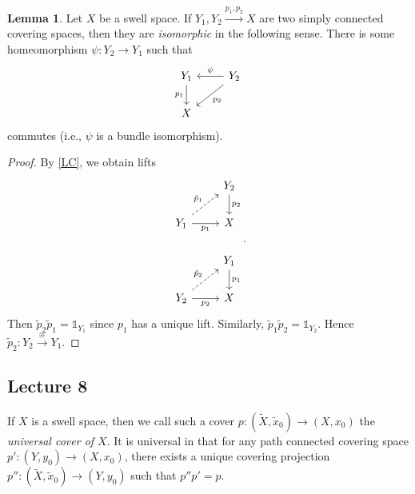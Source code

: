 \documentclass[10pt,letterpaper,cm]{nupset}
\theoremstyle{definition}
\theoremstyle{theorem}
\newtheorem{lemma}[definition]{Lemma}
\theoremstyle{remark}
\newcommand{\1}{\mathbb{1}}
\newcommand{\0}{\vec 0}
\begin{document}
\begin{lemma}
Let $X$ be a swell space.  If $Y_1, Y_2 \overset{p_1, p_2}{\longrightarrow} X$ are two simply connected covering spaces, then they are \textit{isomorphic} in the following sense. There is some homeomorphism $\psi : Y_2 \to Y_1$ such that 
\[
\begin{tikzcd}
Y_1 \arrow[d, "p_1"'] & Y_2 \arrow[ld, "p_2"] \arrow[l, "\psi"'] \\
X & 
\end{tikzcd}
\] commutes (i.e., $\psi$ is a bundle isomorphism).
\end{lemma}
\begin{proof}
By \cref{LC}, we obtain lifts
\[
\begin{tikzcd}
 & Y_2 \arrow[d, "p_2"] \\
Y_1 \arrow[r, "p_1"'] \arrow[ru, "\tilde{p}_1", dashed] & X \\
 & Y_1 \arrow[d, "p_1"] \\
Y_2 \arrow[r, "p_2"'] \arrow[ru, "\tilde{p}_2", dashed] & X
\end{tikzcd}.
\] Then $\tilde{p}_2\tilde{p}_1 = \1_{Y_1}$ since $p_1$ has a unique lift. Similarly, $\tilde{p}_1\tilde{p}_2 = \1_{Y_2}$. Hence $\tilde{p}_2 : Y_2 \overset{\cong}{\longrightarrow} Y_1.$ 
\end{proof}

\subsection{Lecture 8}


If $X$ is a swell space, then we call such a cover $p: \left(\widetilde{X}, \tilde{x}_0\right) \to \left(X, x_0\right)$ the \textit{universal cover of $X$}. It is universal in that for any path connected covering space $p': \left(Y, y_0\right) \to \left(X, x_0\right)$, there exists a unique covering projection $p'': \left(\widetilde{X}, \tilde{x}_0\right) \to \left(Y, y_0\right)$ such that $p'' p' = p$. 
\end{document}
